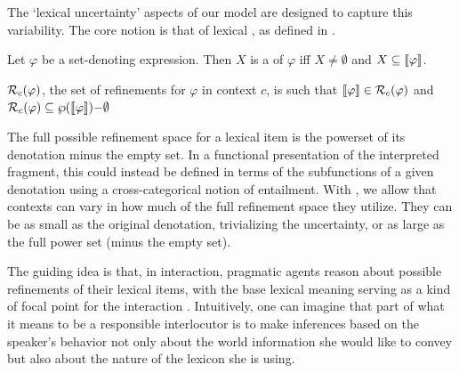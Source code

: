 \documentclass[leqno]{article}
\begin{document}
The `lexical uncertainty' aspects of our model are designed to capture
this variability. The core notion is that of lexical
, as defined in .
%
\begin{examples}
\item\label{refinement} 
  \begin{examples}
  \item Let $\varphi$ be a set-denoting expression. Then $X$ is a
     of $\varphi$ iff $X \neq \emptyset$ and $X
    \subseteq \llbracket\varphi\rrbracket$.
  \item\label{refine} $\mathcal{R}_{c}(\varphi)$, the set of refinements for
    $\varphi$ in context $c$, is such that
    $\llbracket\varphi\rrbracket \in \mathcal{R}_{c}(\varphi)$ and
    $\mathcal{R}_{c}(\varphi) \subseteq \wp(\llbracket\varphi\rrbracket){-}\emptyset$

  \end{examples}
\end{examples}
%
The full possible refinement space for a lexical item is the powerset
of its denotation minus the empty set. In a functional presentation of
the interpreted fragment, this could instead be defined in terms of
the subfunctions of a given denotation using a cross-categorical
notion of entailment. With , we allow that
contexts can vary in how much of the full refinement space they
utilize. They can be as small as the original denotation, trivializing
the uncertainty, or as large as the full power set (minus the empty
set).

The guiding idea is that, in interaction, pragmatic agents reason
about possible refinements of their lexical items, with the base
lexical meaning serving as a kind of focal point for the interaction
\citep{Franke09DISS}.  Intuitively, one can imagine that part of what
it means to be a responsible interlocutor is to make inferences based
on the speaker's behavior not only about the world information she
would like to convey but also about the nature of the lexicon she is
using.
\end{document}
